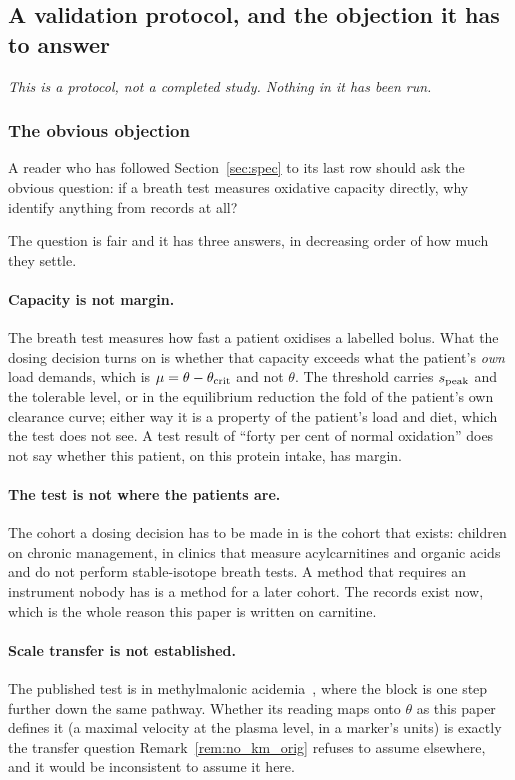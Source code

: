 \subsection{A validation protocol, and the objection it has to answer}
\label{sec:validation}

\emph{This is a protocol, not a completed study. Nothing in it has been run.}

\subsubsection{The obvious objection}
\label{sec:why_not_breath}

A reader who has followed Section~\ref{sec:spec} to its last row should ask the obvious
question: if a breath test measures oxidative capacity directly, why identify
anything from records at all?

The question is fair and it has three answers, in decreasing order of how much they settle.

\paragraph{Capacity is not margin.} The breath test measures how fast a patient oxidises a
labelled bolus. What the dosing decision turns on is whether that capacity exceeds what the
patient's \emph{own} load demands, which is $\mu = \theta - \theta_{\mathrm{crit}}$ and not $\theta$. The
threshold carries $s_{\mathrm{peak}}$ and the tolerable level, or in the equilibrium reduction the fold
of the patient's own clearance curve; either way it is a property of the patient's load and
diet, which the test does not see. A test result of ``forty per cent of normal oxidation''
does not say whether this patient, on this protein intake, has margin.

\paragraph{The test is not where the patients are.} The cohort a dosing decision has to be
made in is the cohort that exists: children on chronic management, in clinics that measure
acylcarnitines and organic acids and do not perform stable-isotope breath tests. A method
that requires an instrument nobody has is a method for a later cohort. The records exist
now, which is the whole reason this paper is written on carnitine.

\paragraph{Scale transfer is not established.} The published test is in methylmalonic
acidemia~\cite{breath_test_mma}, %
where the block is one step further down the same pathway. Whether its reading maps onto
$\theta$ as this paper defines it (a maximal velocity at the plasma level, in a marker's
units) is exactly the transfer question Remark~\ref{rem:no_km_orig} refuses to assume
elsewhere, and it would be inconsistent to assume it here.

